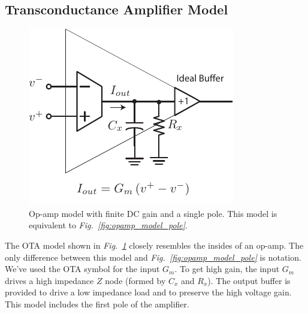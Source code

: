 \subsection{Transconductance Amplifier Model}
\begin{figure}[tb]
\centering
\includegraphics[width=.5\columnwidth]{opamp_ota_model_gain}
\caption{Op-amp model with finite DC gain and a single pole. This model is equivalent to \emph{Fig.~\ref{fig:opamp_model_pole}}.}
\label{fig:opamp_ota_model_gain}
\end{figure}

The OTA model shown in \emph{Fig.~\ref{fig:opamp_ota_model_gain}} closely resembles the insides of an op-amp.  The only difference between this model and \emph{Fig.~\ref{fig:opamp_model_pole}} is notation.  We've used the OTA symbol for the input $G_m$.  To get high gain, the input $G_m$ drives a high impedance $Z$ node (formed by $C_x$ and $R_x$). The output buffer is provided to drive a low impedance load and to preserve the high voltage gain.  This model includes the first pole of the amplifier.
%
%
